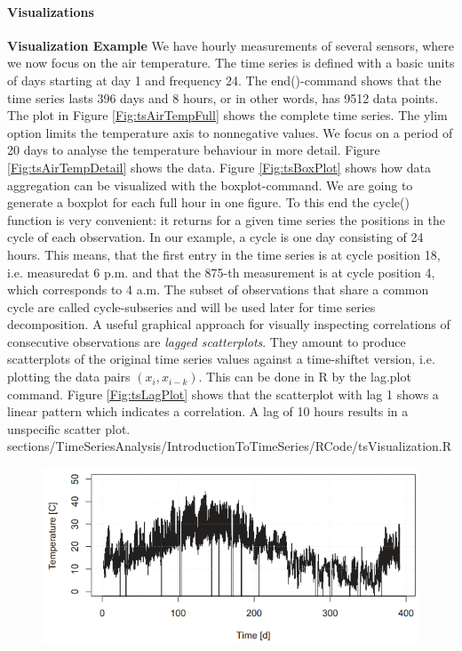 {{\paragraph{Visualizations}
\RTheory
{\textbf{Visualization Example}\vfill
We have hourly measurements of several sensors, where we now focus on the air temperature. The time series is defined with a basic units of days starting at day 1 and frequency 24. The {\color{blue}end()}-command shows that the time series lasts 396 days and 8 hours, or in other words, has 9512 data points. The plot in Figure \ref{Fig:tsAirTempFull} shows the complete time series. The {\color{blue}ylim} option limits the temperature axis to nonnegative values.
\vfill
\hfill
\break
We focus on a period of 20 days to analyse the temperature behaviour in more detail. Figure \ref{Fig:tsAirTempDetail} shows the data.
\vfill
\hfill
\break
Figure \ref{Fig:tsBoxPlot} shows how data aggregation can be visualized with the {\color{blue}boxplot}-command. We are going to generate a boxplot for each full hour in one figure. To this end the {\color{blue}cycle()} function is very convenient: it returns for a given time series the positions in the cycle of each observation. In our example, a cycle is one day consisting of 24 hours. This means, that the first entry in the time series is at cycle position 18, i.e. measuredat 6 p.m. and that the 875-th measurement is at cycle position 4, which corresponds to 4 a.m. The subset of observations that share a common cycle are called cycle-subseries and will be used later for time series decomposition.
\vfill
\hfill
\break
A useful graphical approach for visually inspecting correlations of consecutive observations are \textit{lagged scatterplots}. They amount to produce scatterplots of the original time series values against a time-shiftet version, i.e. plotting the data pairs $(x_i, x_{i-k})$.
This can be done in {\color{blue}R} by the {\color{blue}lag.plot} command. Figure \ref{Fig:tsLagPlot} shows that the scatterplot with lag 1 shows a linear pattern which indicates a correlation. A lag of 10 hours results in a unspecific scatter plot.
}
{sections/TimeSeriesAnalysis/IntroductionToTimeSeries/RCode/tsVisualization.R}
\begin{figure}[H]\centering
	\begin{minipage}[c]{0.42\textwidth}
		\includegraphics[width=1\linewidth]{images/tsAirTempFull.png}

\end{minipage}
\end{figure}}}
